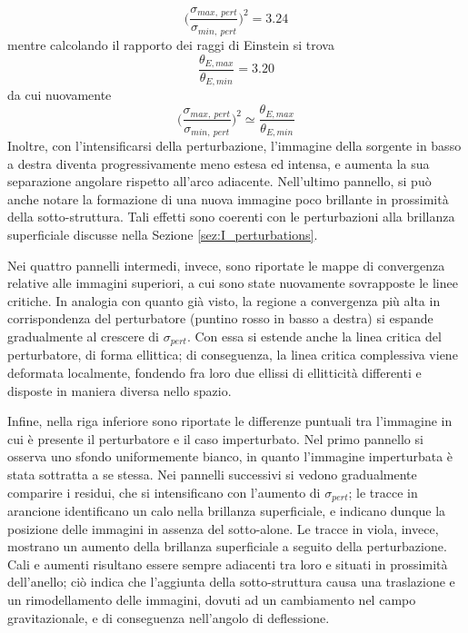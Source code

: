 \begin{equation}
    \Big(\frac{\sigma_{max,\ pert}}{\sigma_{min,\ pert}}\Big)^2 = 3.24
\end{equation}
mentre calcolando il rapporto dei raggi di Einstein si trova
\begin{equation}
    \frac{\theta_{E,max}}{\theta_{E,min}}=3.20
\end{equation}
da cui nuovamente 
\begin{equation}
    \Big(\frac{\sigma_{max,\ pert}}{\sigma_{min,\ pert}}\Big)^2 \simeq  \frac{\theta_{E,max}}{\theta_{E,min}}
\end{equation}
Inoltre, con l'intensificarsi della perturbazione, l'immagine della sorgente in basso a destra diventa progressivamente meno estesa ed intensa, e aumenta la sua separazione angolare rispetto all'arco adiacente. Nell'ultimo pannello, si può anche notare la formazione di una nuova immagine poco brillante in prossimità della sotto-struttura. Tali effetti sono coerenti con le perturbazioni alla brillanza superficiale discusse nella Sezione \ref{sez:I_perturbations}.

Nei quattro pannelli intermedi, invece, sono riportate le mappe di convergenza relative alle immagini superiori, a cui sono state nuovamente sovrapposte le linee critiche.
In analogia con quanto già visto, la regione a convergenza più alta in corrispondenza del perturbatore (puntino rosso in basso a destra) si espande gradualmente al crescere di $\sigma_{pert}$. Con essa si estende anche la linea critica del perturbatore, di forma ellittica; di conseguenza, la linea critica complessiva viene deformata localmente, fondendo fra loro due ellissi di ellitticità differenti e disposte in maniera diversa nello spazio. 

Infine, nella riga inferiore sono riportate le differenze puntuali tra l'immagine in cui è presente il perturbatore e il caso imperturbato. Nel primo pannello si osserva uno sfondo uniformemente bianco, in quanto l'immagine imperturbata è stata sottratta a se stessa. Nei pannelli successivi si vedono gradualmente comparire i residui, che si intensificano con l'aumento di $\sigma_{pert}$; le tracce in arancione identificano un calo nella brillanza superficiale, e indicano dunque la posizione delle immagini in assenza del sotto-alone. Le tracce in viola, invece, mostrano un aumento della brillanza superficiale a seguito della perturbazione. Cali e aumenti risultano essere sempre adiacenti tra loro e situati in prossimità dell'anello; ciò indica che l'aggiunta della sotto-struttura causa una traslazione e un rimodellamento delle immagini, dovuti ad un cambiamento nel campo gravitazionale, e di conseguenza nell'angolo di deflessione.

